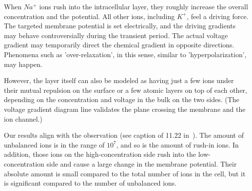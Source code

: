 When $Na^+$ ions rush into the intracellular layer, they roughly increase the overall concentration and the potential. All other ions, including $K^+$,  feel a driving force. The targeted membrane potential is set electrically, and the driving gradients may behave controversially during the transient period. The actual voltage gradient may temporarily direct the chemical gradient in opposite directions.
Phenomena such as 'over-relaxation', in this sense, similar to 'hyperpolarization', may happen.


However, the layer itself can also be modeled
as having just a few ions under their mutual repulsion on the surface
or a few atomic layers on top of each other, depending on the concentration
and voltage in the bulk on the two sides. (The voltage gradient diagram line validates
the plane crossing the membrane and the ion channel.) 


Our results align with the observation (see caption of 11.22 in~\cite{MolecularBiology:2002}).
The amount of unbalanced ions is in the range of $10^7$,
and so is the amount of rush-in ions. In addition, those 
ions on the high-concentration side rush into the 
low-concentration side and cause a large change in the 
membrane potential. Their absolute amount is small compared to the total number of ions in the cell,
but it is significant compared to the number of unbalanced ions.

